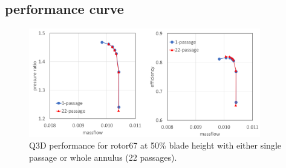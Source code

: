 \documentclass[journal,final]{new-aiaa}
\begin{document}
\subsection{performance curve}


\begin{figure}[htb]
	\centering   
	\includegraphics[width=0.9\textwidth]{pic/rotor67-performance.png}
	\caption{Q3D performance for rotor67 at 50\% blade height with either
		single passage or whole annulus (22 passages).}
	\label{fig:r67-performance}
\end{figure}
\end{document}
